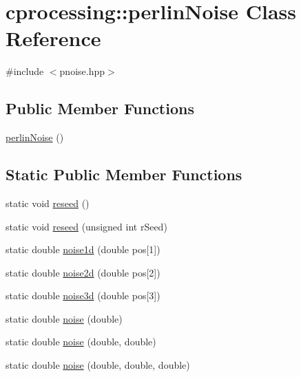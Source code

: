 \hypertarget{classcprocessing_1_1perlinNoise}{\section{cprocessing\-:\-:perlin\-Noise \-Class \-Reference}
\label{classcprocessing_1_1perlinNoise}
}


{\ttfamily \#include $<$pnoise.\-hpp$>$}

\subsection*{\-Public \-Member \-Functions}
\begin{DoxyCompactItemize}
\item 
\hyperlink{classcprocessing_1_1perlinNoise_a2802c221fab01163dc6d03c7024e1b7a}{perlin\-Noise} ()
\end{DoxyCompactItemize}
\subsection*{\-Static \-Public \-Member \-Functions}
\begin{DoxyCompactItemize}
\item 
static void \hyperlink{classcprocessing_1_1perlinNoise_a3f29b9e0c9db0810ef9a940ab283a172}{reseed} ()
\item 
static void \hyperlink{classcprocessing_1_1perlinNoise_aa003dd67e9cd2483a797f645660da77c}{reseed} (unsigned int r\-Seed)
\item 
static double \hyperlink{classcprocessing_1_1perlinNoise_a87402a4577400c4e8135f8872a09cf3d}{noise1d} (double pos\mbox{[}1\mbox{]})
\item 
static double \hyperlink{classcprocessing_1_1perlinNoise_a615ecd150951723f62926b134636cb59}{noise2d} (double pos\mbox{[}2\mbox{]})
\item 
static double \hyperlink{classcprocessing_1_1perlinNoise_a7c125ad868ae1ec9056abff9a406aa10}{noise3d} (double pos\mbox{[}3\mbox{]})
\item 
static double \hyperlink{classcprocessing_1_1perlinNoise_a65ac5b2e3979002afb1c4f5c85add086}{noise} (double)
\item 
static double \hyperlink{classcprocessing_1_1perlinNoise_aac3a547a820cc8b625f57dec9bd58b39}{noise} (double, double)
\item 
static double \hyperlink{classcprocessing_1_1perlinNoise_ab7655cf94e6deffe724d43cf4e55a21a}{noise} (double, double, double)
\end{DoxyCompactItemize}


